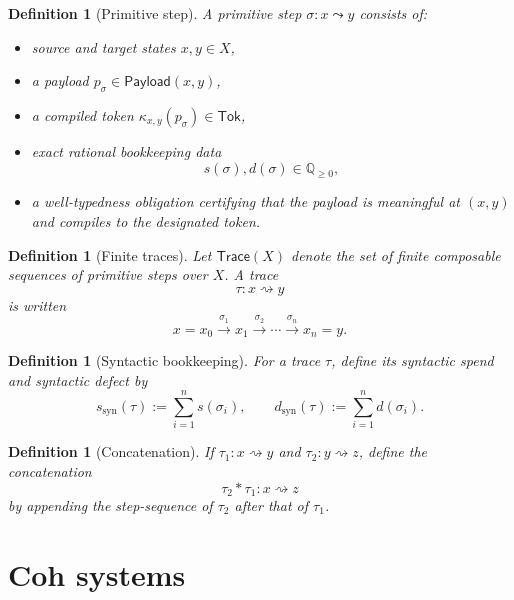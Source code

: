 \documentclass[11pt]{article}
\newtheorem{definition}[theorem]{Definition}
\newcommand{\syn}{\mathrm{syn}}
\newcommand{\Trace}{\mathsf{Trace}}
\newcommand{\Payload}{\mathsf{Payload}}
\newcommand{\Tok}{\mathsf{Tok}}
\begin{document}
\begin{definition}[Primitive step]
A primitive step $\sigma:x\leadsto y$ consists of:
\begin{itemize}[leftmargin=2em]
\item source and target states $x,y\in X$,
\item a payload $p_\sigma\in \Payload(x,y)$,
\item a compiled token $\kappa_{x,y}(p_\sigma)\in \Tok$,
\item exact rational bookkeeping data
\[
s(\sigma),d(\sigma)\in \mathbb Q_{\ge 0},
\]
\item a well-typedness obligation certifying that the payload is meaningful at $(x,y)$ and compiles to the designated token.
\end{itemize}
\end{definition}

\begin{definition}[Finite traces]
Let $\Trace(X)$ denote the set of finite composable sequences of primitive steps over $X$. A trace
\[
\tau:x\rightsquigarrow y
\]
is written
\[
x=x_0 \xrightarrow{\sigma_1} x_1 \xrightarrow{\sigma_2}\cdots \xrightarrow{\sigma_n} x_n=y.
\]
\end{definition}

\begin{definition}[Syntactic bookkeeping]
For a trace $\tau$, define its syntactic spend and syntactic defect by
\[
s_{\syn}(\tau):=\sum_{i=1}^n s(\sigma_i),
\qquad
d_{\syn}(\tau):=\sum_{i=1}^n d(\sigma_i).
\]
\end{definition}

\begin{definition}[Concatenation]
If $\tau_1:x\rightsquigarrow y$ and $\tau_2:y\rightsquigarrow z$, define the concatenation
\[
\tau_2 * \tau_1 : x\rightsquigarrow z
\]
by appending the step-sequence of $\tau_2$ after that of $\tau_1$.
\end{definition}

\section{Coh systems}
\end{document}

